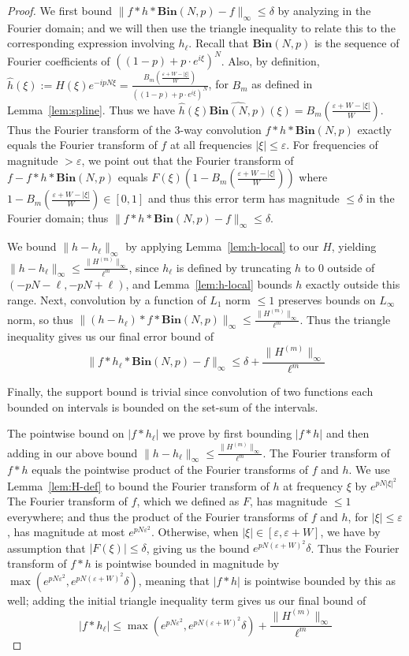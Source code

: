 \documentclass[11pt]{article}
\theoremstyle{plain}
\newcommand{\Bin}[2]{\textbf{Bin}(#1,#2)}
\newcommand{\eps}{\varepsilon}
\begin{document}
\begin{proof}


We first bound $\|f\ast h\ast \Bin{N}{p}-f\|_\infty\leq \delta$ by analyzing in the Fourier domain; and we will then use the triangle inequality to relate this to the corresponding expression involving $h_\ell$. Recall that $\Bin{N}{p}$ is the sequence of Fourier coefficients of $((1-p)+p\cdot e^{i \xi})^N$. Also, by definition, $\widehat{h}(\xi):=H(\xi)e^{-i p N \xi}=\frac{B_m(\frac{\eps+W-|\xi|}{W})}{((1-p)+p\cdot e^{i \xi})^N}$, for $B_m$ as defined in Lemma~\ref{lem:spline}. Thus we have $\widehat{h}(\xi)\widehat{\Bin{N}{p}}(\xi)=B_m(\frac{\eps+W-|\xi|}{W})$. Thus the Fourier transform of the 3-way convolution $f\ast h\ast \Bin{N}{p}$ exactly equals the Fourier transform of $f$ at all frequencies $|\xi|\leq \eps$. For frequencies of magnitude $>\eps$, we point out that the Fourier transform of $f-f\ast h\ast \Bin{N}{p}$ equals $F(\xi)(1-B_m(\frac{\eps+W-|\xi|}{W}))$ where $1-B_m(\frac{\eps+W-|\xi|}{W})\in [0,1]$ and thus this error term has magnitude $\leq \delta$ in the Fourier domain; thus $\|f\ast h\ast \Bin{N}{p}-f\|_{\infty}\leq \delta$.

We bound $\|h-h_\ell\|_\infty$ by applying Lemma~\ref{lem:h-local} to our $H$, yielding $\|h-h_\ell\|_\infty\leq \frac{ \|H^{(m)}\|_{\infty}}{\ell^m}$, since $h_\ell$ is defined by truncating $h$ to 0 outside of $(-pN-\ell,-pN+\ell)$, and Lemma~\ref{lem:h-local} bounds $h$ exactly outside this range. Next, convolution by a function of $L_1$ norm $\leq 1$ preserves bounds on $L_\infty$ norm, so thus $\|(h-h_\ell)\ast f\ast \Bin{N}{p}\|_\infty\leq \frac{ \|H^{(m)}\|_{\infty}}{\ell^m}$. Thus the triangle inequality gives us our final error bound of \[\|f\ast h_\ell\ast \Bin{N}{p}-f\|_{\infty}\leq \delta+\frac{ \|H^{(m)}\|_{\infty}}{\ell^m}\]

Finally, the support bound is trivial since convolution of two functions each bounded on intervals is bounded on the set-sum of the intervals.

The pointwise bound on $|f\ast h_\ell|$ we prove by first bounding $|f\ast h|$ and then adding in our above bound $\|h-h_\ell\|_\infty\leq \frac{\|H^{(m)}\|_{\infty}}{\ell^m}$. The Fourier transform of $f\ast h$ equals the pointwise product of the Fourier transforms of $f$ and $h$. We use Lemma~\ref{lem:H-def} to bound the Fourier transform of $h$ at frequency $\xi$ by $e^{pN|\xi|^2}$ The Fourier transform of $f$, which we defined as $F$, has magnitude $\leq 1$ everywhere; and thus the product of the Fourier transforms of $f$ and $h$, for $|\xi|\leq \eps$, has magnitude at most $e^{pN\eps^2}$. Otherwise, when $|\xi|\in [\eps,\eps+W]$, we have by assumption that $|F(\xi)|\leq \delta$, giving us the bound $e^{pN(\eps+W)^2}\delta$. Thus the Fourier transform of $f\ast h$ is pointwise bounded in magnitude by $\max(e^{pN\eps^2}, e^{pN(\eps+W)^2}\delta)$, meaning that $|f\ast h|$ is pointwise bounded by this as well; adding the initial triangle inequality term gives us our final bound of \[|f\ast h_\ell|\leq  \max(e^{pN\eps^2}, e^{pN(\eps+W)^2}\delta)+\frac{ \|H^{(m)}\|_{\infty}}{\ell^m}\]


\end{proof}
\end{document}
